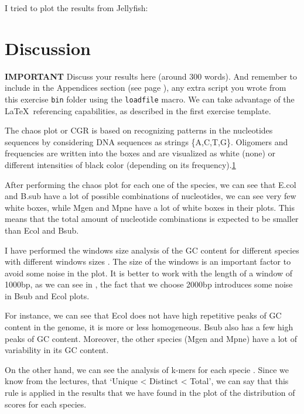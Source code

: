 \documentclass[10pt,a4paper,]{article}
\begin{document}
I tried to plot the results from Jellyfish:


\clearpage
\newpage

\hypertarget{discussion}{%
\section{Discussion}\label{discussion}}

\textbf{IMPORTANT} Discuss your results here (around 300 words). And
remember to include in the Appendices section (see page
\pageref{sec:appendices}), any extra script you wrote from this exercise
\texttt{bin} folder using the \texttt{loadfile} macro. We can take
advantage of the \LaTeX~referencing capabilities, as described in the
first exercise template.

The chaos plot or CGR is based on recognizing patterns in the
nucleotides sequences by considering DNA sequences as strings
\{A,C,T,G\}. Oligomers and frequencies are written into the boxes and
are visualized as white (none) or different intensities of black color
(depending on its
frequency).\href{https://doi.org/10.1093/nar/18.8.2163}{1}

After performing the chaos plot \pageref{fig:chaosplot} for each one of
the species, we can see that E.col and B.sub have a lot of possible
combinations of nucleotides, we can see very few white boxes, while Mgen
and Mpne have a lot of white boxes in their plots. This means that the
total amount of nucleotide combinations is expected to be smaller than
Ecol and Bsub.

I have performed the windows size analysis of the GC content for
different species with different windows sizes
\pageref{fig:winlength_species}. The size of the windows is an important
factor to avoid some noise in the plot. It is better to work with the
length of a window of 1000bp, as we can see in \pageref{fig:winlength},
the fact that we choose 2000bp introduces some noise in Bsub and Ecol
plots.

For instance, we can see that Ecol does not have high repetitive peaks
of GC content in the genome, it is more or less homogeneous. Bsub also
has a few high peaks of GC content. Moreover, the other species (Mgen
and Mpne) have a lot of variability in its GC content.

On the other hand, we can see the analysis of k-mers for each specie
\pageref{fig:rplots}. Since we know from the lectures, that `Unique
\textless{} Distinct \textless{} Total', we can say that this rule is
applied in the results that we have found in the plot of the
distribution of scores for each species.
\end{document}

